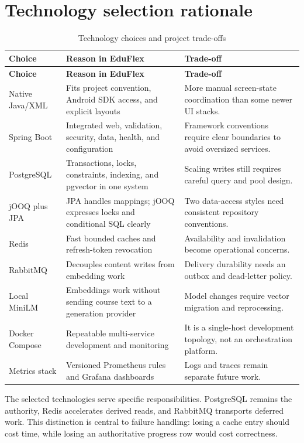 \documentclass[12pt,a4paper,oneside]{report}
\begin{document}
\section{Technology selection rationale}
\begin{longtable}{P{0.22\textwidth}P{0.34\textwidth}P{0.33\textwidth}}
\caption{Technology choices and project trade-offs}\\\toprule
\textbf{Choice} & \textbf{Reason in EduFlex} & \textbf{Trade-off}\\\midrule\endfirsthead
\toprule\textbf{Choice} & \textbf{Reason in EduFlex} & \textbf{Trade-off}\\\midrule\endhead
Native Java/XML & Fits project convention, Android SDK access, and explicit layouts & More manual screen-state coordination than some newer UI stacks.\\
Spring Boot & Integrated web, validation, security, data, health, and configuration & Framework conventions require clear boundaries to avoid oversized services.\\
PostgreSQL & Transactions, locks, constraints, indexing, and pgvector in one system & Scaling writes still requires careful query and pool design.\\
jOOQ plus JPA & JPA handles mappings; jOOQ expresses locks and conditional SQL clearly & Two data-access styles need consistent repository conventions.\\
Redis & Fast bounded caches and refresh-token revocation & Availability and invalidation become operational concerns.\\
RabbitMQ & Decouples content writes from embedding work & Delivery durability needs an outbox and dead-letter policy.\\
Local MiniLM & Embeddings work without sending course text to a generation provider & Model changes require vector migration and reprocessing.\\
Docker Compose & Repeatable multi-service development and monitoring & It is a single-host development topology, not an orchestration platform.\\
Metrics stack & Versioned Prometheus rules and Grafana dashboards & Logs and traces remain separate future work.\\
\bottomrule
\end{longtable}

The selected technologies serve specific responsibilities. PostgreSQL remains the
authority, Redis accelerates derived reads, and RabbitMQ transports deferred work.
This distinction is central to failure handling: losing a cache entry should cost
time, while losing an authoritative progress row would cost correctness.
\end{document}
